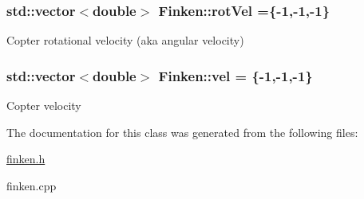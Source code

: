 \subsubsection[{\texorpdfstring{rot\+Vel}{rotVel}}]{\setlength{\rightskip}{0pt plus 5cm}std\+::vector$<$double$>$ Finken\+::rot\+Vel =\{-\/1,-\/1,-\/1\}}\hypertarget{classFinken_a518ab8ab8ac8cf54c0b79cbc1ec2075f}{}\label{classFinken_a518ab8ab8ac8cf54c0b79cbc1ec2075f}
Copter rotational velocity (aka angular velocity) 
\subsubsection[{\texorpdfstring{vel}{vel}}]{\setlength{\rightskip}{0pt plus 5cm}std\+::vector$<$double$>$ Finken\+::vel = \{-\/1,-\/1,-\/1\}}\hypertarget{classFinken_a4dd260e6384e7cfb8040bd53fe1c2d62}{}\label{classFinken_a4dd260e6384e7cfb8040bd53fe1c2d62}
Copter velocity 

The documentation for this class was generated from the following files\+:\begin{DoxyCompactItemize}
\item 
\hyperlink{finken_8h}{finken.\+h}\item 
finken.\+cpp\end{DoxyCompactItemize}
